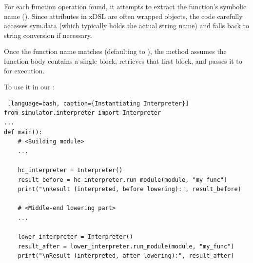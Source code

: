 \documentclass[../main.tex]{subfiles}
\begin{document}
For each function operation found, it attempts to extract the
function’s symbolic name (). Since attributes in xDSL are
often wrapped objects, the code carefully accesses sym.data
(which typically holds the actual string name) and falls back to
string conversion if necessary.

Once the function name matches  (defaulting to ),
the method assumes the function body contains a single block, retrieves that
first block, and passes it to  for execution.

To use it in our :
\begin{lstlisting} [language=bash, caption={Instantiating Interpreter}]
from simulator.interpreter import Interpreter
...
def main():
    # <Building module>
    ...

    hc_interpreter = Interpreter()
    result_before = hc_interpreter.run_module(module, "my_func")
    print("\nResult (interpreted, before lowering):", result_before)

    # <Middle-end lowering part>
    ...

    lower_interpreter = Interpreter()
    result_after = lower_interpreter.run_module(module, "my_func")
    print("\nResult (interpreted, after lowering):", result_after)
    \end{lstlisting}
\end{document}
